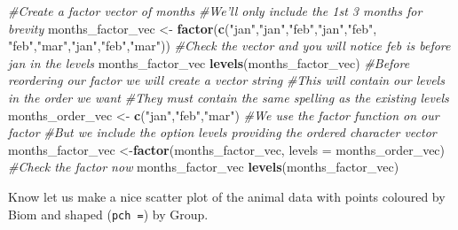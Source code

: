 \documentclass[]{book}
\newenvironment{Shaded}{\begin{snugshade}}{\end{snugshade}}
\newcommand{\KeywordTok}[1]{\textcolor[rgb]{0.13,0.29,0.53}{\textbf{#1}}}
\newcommand{\DataTypeTok}[1]{\textcolor[rgb]{0.13,0.29,0.53}{#1}}
\newcommand{\StringTok}[1]{\textcolor[rgb]{0.31,0.60,0.02}{#1}}
\newcommand{\CommentTok}[1]{\textcolor[rgb]{0.56,0.35,0.01}{\textit{#1}}}
\newcommand{\NormalTok}[1]{#1}
\begin{document}
\begin{Shaded}
\begin{Highlighting}[]
\CommentTok{#Create a factor vector of months}
\CommentTok{#We'll only include the 1st 3 months for brevity}
\NormalTok{months_factor_vec <-}\StringTok{ }\KeywordTok{factor}\NormalTok{(}\KeywordTok{c}\NormalTok{(}\StringTok{"jan"}\NormalTok{,}\StringTok{"jan"}\NormalTok{,}\StringTok{"feb"}\NormalTok{,}\StringTok{"jan"}\NormalTok{,}\StringTok{"feb"}\NormalTok{,}
                     \StringTok{"feb"}\NormalTok{,}\StringTok{"mar"}\NormalTok{,}\StringTok{"jan"}\NormalTok{,}\StringTok{"feb"}\NormalTok{,}\StringTok{"mar"}\NormalTok{))}
\CommentTok{#Check the vector and you will notice feb is before jan in the levels}
\NormalTok{months_factor_vec}
\KeywordTok{levels}\NormalTok{(months_factor_vec)}
\CommentTok{#Before reordering our factor we will create a vector string}
\CommentTok{#This will contain our levels in the order we want}
\CommentTok{#They must contain the same spelling as the existing levels}
\NormalTok{months_order_vec <-}\StringTok{ }\KeywordTok{c}\NormalTok{(}\StringTok{"jan"}\NormalTok{,}\StringTok{"feb"}\NormalTok{,}\StringTok{"mar"}\NormalTok{)}
\CommentTok{#We use the factor function on our factor}
\CommentTok{#But we include the option levels providing the ordered character vector}
\NormalTok{months_factor_vec <-}\KeywordTok{factor}\NormalTok{(months_factor_vec, }
                           \DataTypeTok{levels =}\NormalTok{ months_order_vec)}
\CommentTok{#Check the factor now}
\NormalTok{months_factor_vec}
\KeywordTok{levels}\NormalTok{(months_factor_vec)}
\end{Highlighting}
\end{Shaded}

Know let us make a nice scatter plot of the animal data with points
coloured by Biom and shaped (\texttt{pch\ =}) by Group.
\end{document}

